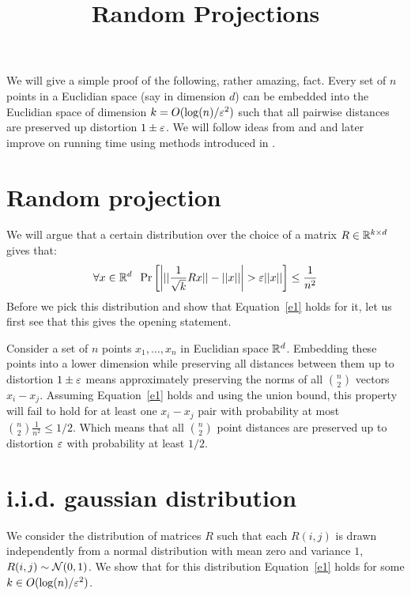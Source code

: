 \documentclass{article}
\title{Random Projections} %
\begin{document}
\maketitle
We will give a simple proof of the following, rather amazing, fact. Every set of $n$ points 
in a Euclidian space (say in dimension $d$) can be embedded into the Euclidian space of 
dimension $k = O(\log(n)/\varepsilon^2)$ such that all pairwise distances are preserved up distortion $1\pm \varepsilon$.
We will follow ideas from \cite{JL84} and \cite{DasGuptaGupta99} and later improve on running time using 
methods introduced in \cite{AilonCh06}.

\section*{Random projection}
We will argue that a certain distribution over the choice of a matrix $R \in {\mathbb{R}}^{k \times d}$ gives that:
\begin{equation}
\label{e1}
\forall x \in {\mathbb{R}}^{d} \;\; \Pr\left[ \left| ||\frac{1}{\sqrt{k}}Rx|| - ||x|| \right| > \varepsilon||x|| \right] \le \frac{1}{n^2} 
\end{equation}
Before we pick this distribution and show that Equation~\ref{e1} holds for it, let us first see
that this gives the opening statement. 

Consider a set of $n$ points $x_1,\ldots, x_n$ in Euclidian space ${\mathbb{R}}^d$. Embedding these points
into a lower dimension while preserving all distances between
them up to distortion $1\pm \varepsilon$ means approximately preserving the norms of all 
${n \choose 2}$ vectors $x_i - x_j$. Assuming Equation~\ref{e1} holds and using the union 
bound, this property will fail to hold for at least one $x_i - x_j$ pair with probability at most ${n \choose 2}\frac{1}{n^2} \le 1/2$.
Which means that all ${n \choose 2}$ point distances are preserved up to distortion $\varepsilon$ with probability at least $1/2$.


\section{i.i.d. gaussian distribution}
We consider the distribution of matrices $R$ such that each $R(i,j)$ is drawn independently from  a
normal distribution with mean zero and variance $1$, $R(i,j) \sim {\mathcal{N}}(0,1)$. We show that for this
distribution Equation~\ref{e1} holds for some $k \in O(\log(n)/\varepsilon^2)$.
\end{document}
